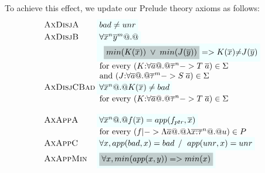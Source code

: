 \documentclass[preprint,nocopyrightspace,draft]{sigplanconf}
\begin{document}
To achieve this effect, we update our Prelude theory axioms as follows:
{\small
\[\setlength{\arraycolsep}{1pt}
\begin{array}{c}
\begin{array}{lll}
 \textsc{AxDisjA} & \formula{\bad \neq \unr}  \\ 
 \textsc{AxDisjB} & \formula{\forall \oln{x}{n}\oln{y}{m} @.@} \\ 
                  & \formula{\;\;\highlight{min(K(\ol{x}))\;\lor\;min(J(\ol{y}))} =>
                                  K(\ol{x}){\neq}J(\ol{y})} \\
                  & \text{ for every } (K{:}\forall\as @.@ \oln{\tau}{n} -> T\;\as) \in \Sigma \\ 
                  & \text{ and } (J{:}\forall\as @.@ \oln{\tau}{m} -> S\;\as) \in \Sigma \\
 \textsc{AxDisjCBad} & \formula{\forall \oln{x}{n} @.@ K(\ol{x}) \neq \bad} \\ 
                  & \text{ for every } (K{:}\forall\as @.@ \oln{\tau}{n} -> T\;\as) \in \Sigma \\ \\

 \textsc{AxAppA}  & \formula{\forall \oln{x}{n} @.@ f(\ol{x}) = app(f_{ptr},\xs)} \\
                  & \text{ for every } (f |-> \Lambda\as @.@ \lambda\oln{x{:}\tau}{n} @.@ u) \in P \\
 \textsc{AxAppC}  & \formula{\forall x, app(\bad,x) = \bad \; /\ \; app(\unr,x) = \unr}    \\ 
 \textsc{AxAppMin}& \formula{\highlight{\forall x, min(app(x,y)) => min(x)}} \\ 


\end{array}
\end{array}\]}
\end{document}
